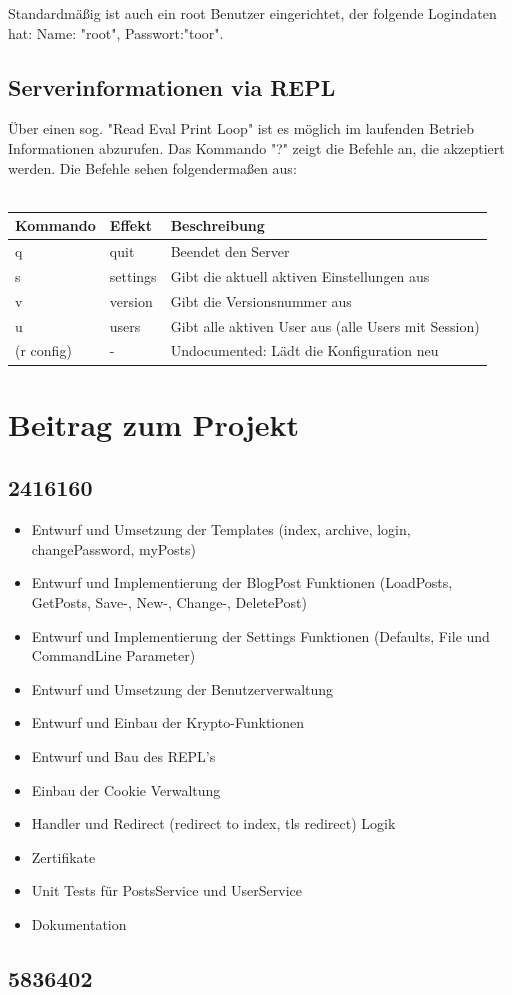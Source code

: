 \documentclass[10pt]{article}
\begin{document}
		Standardm\"a{\ss}ig ist auch ein root Benutzer eingerichtet, der folgende Logindaten hat: Name: "root", Passwort:"toor".
		\subsection{Serverinformationen via REPL}
		\"Uber einen sog. "Read Eval Print Loop" ist es m\"oglich im laufenden Betrieb Informationen abzurufen.
		Das Kommando "?" zeigt die Befehle an, die akzeptiert werden. Die Befehle sehen folgenderma{\ss}en aus:\\\\
		\begin{tabular}{l|l|l}
			Kommando   & Effekt   & Beschreibung\\
			\hline
			q          & quit     & Beendet den Server\\
			s          & settings & Gibt die aktuell aktiven Einstellungen aus\\
			v          & version  & Gibt die Versionsnummer aus\\
			u          & users    & Gibt alle aktiven User aus (alle Users mit Session)\\
			(r config) & -        & Undocumented: L\"adt die Konfiguration neu
		\end{tabular}
	\section{Beitrag zum Projekt}
		\subsection{2416160}
		\begin{itemize}
			\item Entwurf und Umsetzung der Templates (index, archive, login, changePassword, myPosts)
			\item Entwurf und Implementierung der BlogPost Funktionen (LoadPosts, GetPosts, Save-, New-, Change-, DeletePost)
			\item Entwurf und Implementierung der Settings Funktionen (Defaults, File und CommandLine Parameter)
			\item Entwurf und Umsetzung der Benutzerverwaltung
			\item Entwurf und Einbau der Krypto-Funktionen
			\item Entwurf und Bau des REPL's
			\item Einbau der Cookie Verwaltung
			\item Handler und Redirect (redirect to index, tls redirect) Logik
			\item Zertifikate
			\item Unit Tests f\"ur PostsService und UserService
			\item Dokumentation
		\end{itemize}
		\subsection{5836402}
\end{document}
